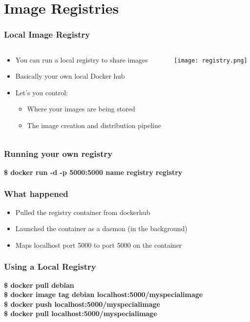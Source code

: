 \documentclass[aspectratio=169,11pt,hyperref={colorlinks=true}]{beamer}
\begin{document}
\section{Image Registries}
\begin{frame}
    \frametitle{Local Image Registry}
    \begin{columns}[T]
        \begin{column}{.48\textwidth}
            \begin{itemize}
                \item You can run a local registry to share images
                \item Basically your own local Docker hub
                \item Let's you control:
                    \begin{itemize}
                        \item Where your images are being stored
                        \item The image creation and distribution pipeline
                    \end{itemize}
            \end{itemize}
        \end{column}
        \begin{column}{.48\textwidth}
            \centering
            \texttt{[image: registry.png]}
        \end{column}
    \end{columns}
\end{frame}

\begin{frame}
    \frametitle{Running your own registry}
    {\Large \textbf{\$ docker run -d -p 5000:5000 \-\-name registry registry}}
\end{frame}

\begin{frame}
    \frametitle{What happened}
    \begin{itemize}
        \item Pulled the registry container from dockerhub
        \item Launched the container as a daemon (in the background)
        \item Maps localhost port 5000 to port 5000 on the container
    \end{itemize}
\end{frame}

\begin{frame}
    \frametitle{Using a Local Registry}
    \textbf{\$ docker pull debian} \\
    \textbf{\$ docker image tag debian localhost:5000/myspecialimage} \\
    \textbf{\$ docker push localhost:5000/myspecialimage} \\
    \textbf{\$ docker pull localhost:5000/myspecialimage}
\end{frame}
\end{document}
